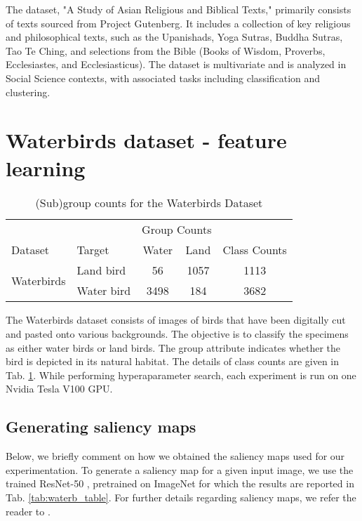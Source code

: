 The dataset, "A Study of Asian Religious and Biblical Texts," \citep{sah2019biblical} primarily consists of texts sourced from Project Gutenberg. It includes a collection of key religious and philosophical texts, such as the Upanishads, Yoga Sutras, Buddha Sutras, Tao Te Ching, and selections from the Bible (Books of Wisdom, Proverbs, Ecclesiastes, and Ecclesiasticus). The dataset is multivariate and is analyzed in Social Science contexts, with associated tasks including classification and clustering.



\section{Waterbirds dataset - feature learning}
\label{appx:sec_E}


\begin{table}[htbp]
    \centering
    \begin{tabular}{l|lccc}
         &  & \multicolumn{2}{c}{Group Counts} & \\
        \cmidrule(lr){3-4} 
        Dataset & Target & Water & Land & Class Counts \\ \midrule
        \multirow{2}{*}{Waterbirds} & Land bird & 56 & 1057 & 1113 \\ 
        & Water bird & 3498 & 184 & 3682 \\ 
        \bottomrule
    \end{tabular}
    \caption{(Sub)group counts for the Waterbirds Dataset}
    \label{tab:waterbirds_counts}
\end{table}

The Waterbirds dataset consists of images of birds that have been digitally cut and pasted onto various backgrounds. The objective is to classify the specimens as either water birds or land birds. The group attribute indicates whether the bird is depicted in its natural habitat. The details of class counts are given in Tab. \ref{tab:waterbirds_counts}. While performing hyperaparameter search, each experiment is run on one Nvidia Tesla V100 GPU.


\subsection{Generating saliency maps}
Below, we briefly comment on how we obtained the saliency maps used for our experimentation. To generate a saliency map for a given input image, we use the trained ResNet-50 \citep{he2016deep}, pretrained on ImageNet \citep{imagenet} for which the results are reported in Tab. \ref{tab:waterb_table}. For further details regarding saliency maps, we refer the reader to \citet{simonyan2014visualising}.

